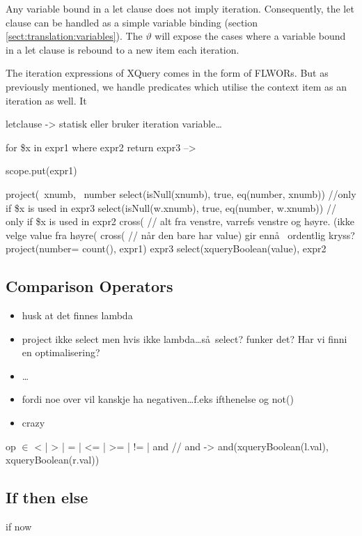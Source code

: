 Any variable bound in a \textsf{let} clause does not imply iteration. Consequently, the \textsf{let} clause can be
handled as a simple variable binding (section \ref{sect:translation:variables}). The $\vartheta$ will expose the
cases where a variable bound in a \textsf{let} clause is rebound to a new item each iteration.





The iteration expressions of XQuery comes in the form of FLWORs. But as
previously mentioned, we handle predicates which utilise the context item as an
iteration as well. It 


letclause -> statisk eller bruker iteration variable\ldots

for \$x in expr1 where expr2 return expr3  -->

scope.put(expr1)

project(~xnumb, ~number
    select(isNull(xnumb), true, eq(number, xnumb))             
    //only if \$x is  used in expr3 
    select(isNull(w.xnumb), true, eq(number, w.xnumb))         
    // only if \$x is used in expr2 
        cross(                     
    // alt fra venstre, varrefs venstre og høyre. (ikke velge value fra h\o yre(
            cross(                                             
          //  n\aa r den bare har value) gir enn\aa~ ordentlig kryss?
                project(number= count(), 
                    expr1)
                expr3
        select(xqueryBoolean(value),                                  
            expr2

\subsection{Comparison Operators}
\label{sect:translation:compOps}

\begin{itemize}
  \item husk at det finnes lambda
  \item project ikke select men hvis ikke lambda\ldots s\aa~select? funker det? Har vi finni en optimalisering?
  \item \ldots
  \item fordi noe over vil kanskje ha negativen\ldots f.eks ifthenelse og not()
  \item crazy
\end{itemize}
op $\in$ {< | > | = | <= | >= | != | and }        // and ->
and(xqueryBoolean(l.val), xqueryBoolean(r.val))

\subsection{If then else}
\label{sect:translation:ifThenElse}
if
now

